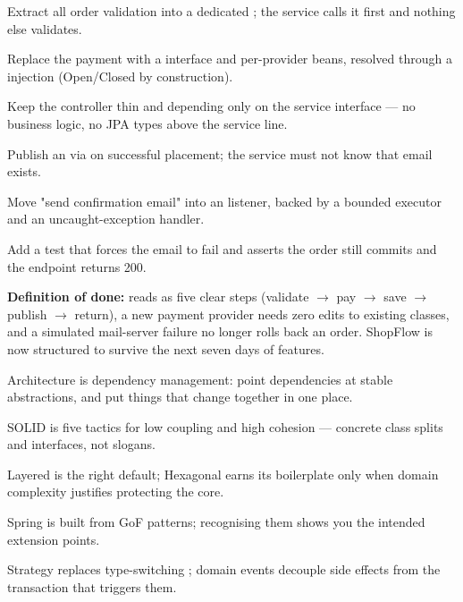 \begin{buildalong}
\begin{wbitem}
  \item Extract all order validation into a dedicated  ; the service calls it first and nothing else validates.
  \item Replace the payment  with a  interface and per-provider beans, resolved through a  injection (Open/Closed by construction).
  \item Keep the controller thin and depending only on the service interface --- no business logic, no JPA types above the service line.
  \item Publish an  via  on successful placement; the service must not know that email exists.
  \item Move "send confirmation email" into an  listener, backed by a bounded executor and an uncaught-exception handler.
  \item Add a test that forces the email to fail and asserts the order still commits and the endpoint returns 200.
\end{wbitem}
\smallskip\textbf{Definition of done:}  reads as five clear steps (validate $\rightarrow$ pay $\rightarrow$ save $\rightarrow$ publish $\rightarrow$ return), a new payment provider needs zero edits to existing classes, and a simulated mail-server failure no longer rolls back an order. ShopFlow is now structured to survive the next seven days of features.
\end{buildalong}


\begin{tickcheck}
  \item Architecture is dependency management: point dependencies at stable abstractions, and put things that change together in one place.
  \item SOLID is five tactics for low coupling and high cohesion --- concrete class splits and interfaces, not slogans.
  \item Layered is the right default; Hexagonal earns its boilerplate only when domain complexity justifies protecting the core.
  \item Spring is built from GoF patterns; recognising them shows you the intended extension points.
  \item Strategy replaces type-switching ; domain events decouple side effects from the transaction that triggers them.
\end{tickcheck}

